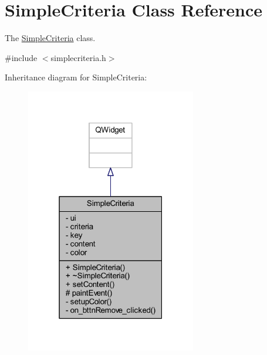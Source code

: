 \hypertarget{class_simple_criteria}{\section{Simple\+Criteria Class Reference}
\label{class_simple_criteria}
}


The \hyperlink{class_simple_criteria}{Simple\+Criteria} class.  




{\ttfamily \#include $<$simplecriteria.\+h$>$}



Inheritance diagram for Simple\+Criteria\+:
\nopagebreak
\begin{figure}[H]
\begin{center}
\leavevmode
\includegraphics[width=211pt]{class_simple_criteria__inherit__graph}
\end{center}
\end{figure}


